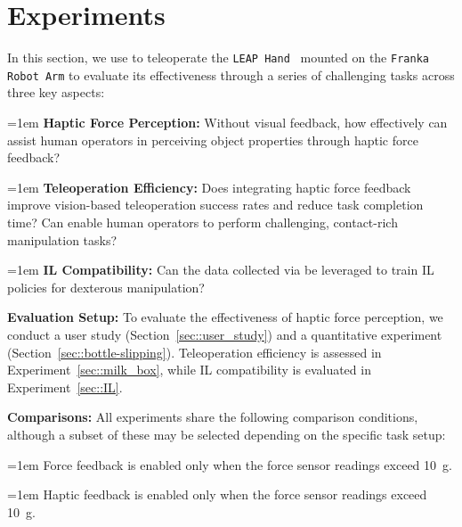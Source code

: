 \section{Experiments}
\label{sec:experiments}

In this section, we use \oursystem to teleoperate the \texttt{LEAP Hand}~\cite{shaw2023leaphand} mounted on the \texttt{Franka Robot Arm} to evaluate its effectiveness through a series of challenging tasks across three key aspects:

\vspace{1mm}

\hangindent=1em
\noindent\textbullet\hspace{0.5em}\textbf{Haptic Force Perception:} Without visual feedback, how effectively can \oursystem assist human operators in perceiving object properties through haptic force feedback?

\hangindent=1em
\noindent\textbullet\hspace{0.5em}\textbf{Teleoperation Efficiency:} Does integrating haptic force feedback improve vision-based teleoperation success rates and reduce task completion time? Can \oursystem enable human operators to perform challenging, contact-rich manipulation tasks?

\hangindent=1em
\noindent\textbullet\hspace{0.5em}\textbf{IL Compatibility:} Can the data collected via \oursystem be leveraged to train IL policies for dexterous manipulation?

\vspace{1mm}

\noindent \textbf{Evaluation Setup:} To evaluate the effectiveness of haptic force perception, we conduct a user study (Section~\ref{sec::user_study}) and a quantitative experiment (Section~\ref{sec::bottle-slipping}). Teleoperation efficiency is assessed in Experiment~\ref{sec::milk_box}, while IL compatibility is evaluated in Experiment~\ref{sec::IL}.

\vspace{1mm}

\noindent \textbf{Comparisons:} All experiments share the following comparison conditions, although a subset of these may be selected depending on the specific task setup:

\hangindent=1em
\noindent\textbullet\hspace{0.5em} Force feedback is enabled only when the force sensor readings exceed 10~g.

\hangindent=1em
\noindent\textbullet\hspace{0.5em} Haptic feedback is enabled only when the force sensor readings exceed 10~g.


